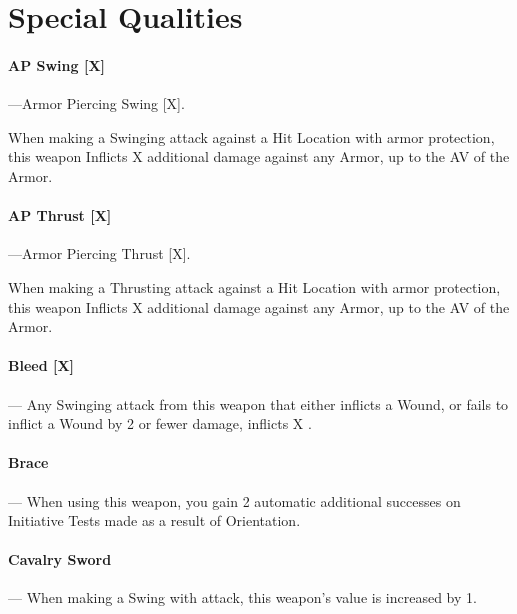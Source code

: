 \documentclass[oneside,11pt,english]{book}
\begin{document}
\section{Special Qualities}\label{sec:weapons-special-qualities}
\vspace{-5pt}\paragraph[AP Swing]{\label{wepqual:AP Swing}AP Swing [X]}---\quad Armor Piercing Swing [X].

When making a Swinging attack against a Hit Location with  armor protection, this weapon Inflicts X additional damage against any Armor, up to the AV of the Armor.

\vspace{-5pt}\paragraph[AP Thrust]{\label{wepqual:AP Thrust}AP Thrust [X]}---\quad Armor Piercing Thrust [X].

When making a Thrusting attack against a Hit Location with  armor protection, this weapon Inflicts X additional damage against any Armor, up to the AV of the Armor.

\vspace{-5pt}\paragraph[Bleed]{\label{wepqual:Bleed}Bleed [X]}---\quad
Any Swinging attack from this weapon that either inflicts a Wound, or fails to inflict a Wound by 2 or fewer damage, inflicts X .

\vspace{-5pt}\paragraph{\label{wepqual:Brace}Brace}---\quad
When using this weapon, you gain 2 automatic additional successes on Initiative Tests made as a result of  Orientation.

\vspace{-5pt}\paragraph{\label{wepqual:Cavalry Sword}Cavalry Sword}---\quad
When making a Swing with  attack, this weapon’s  value is increased by 1.
\end{document}
